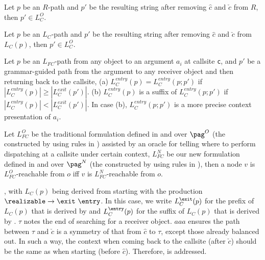 \begin{lemma} \label{theorem:Rrealizable}
Let $p$ be an $R$-path and $p'$ be the resulting string after removing $\hat{\boxed{c}}$ 
and $\check{\boxed{c}}$ from $R$, then $p' \in L_{C}^{O}$.  
\end{lemma}

\begin{corollary} \label{theorem:LCrealizable}
Let $p$ be an $L_{C}$-path and $p'$ be the resulting string after removing $\hat{\boxed{c}}$ 
and $\check{\boxed{c}}$ from $L_C(p)$, then $p' \in L_{C}^{O}$.  
\end{corollary}


\begin{lemma} \label{theorem:ContextRecovery}
Let $p$ be an $L_{FC}$-path from any object to an argument $a_i$ at callsite \texttt{c}, and $p'$ be a grammar-guided path from the argument to any receiver object and then returning back to the callsite, (a) $L_C^{entry} (p) = L_C^{entry}(p;p')$ if $|L_C^{entry} (p)| \geq |L_C^{exit}(p')|$.  (b) $L_C^{entry} (p)$ is a suffix of $L_C^{entry}(p;p')$ if $|L_C^{entry} (p)| < |L_C^{exit}(p')|$.
In case (b), $L_C^{entry}(p;p')$ is a more precise context presentation of $a_i$. 
\end{lemma}

\begin{theorem} \label{theorem:correctness}
Let $L_{FC}^{O}$ be the traditional formulation \cite{sridharan2005demand, sridharan2006refinement} defined in  and  over $\pag^{O}$ (the \pag constructed by using rules in 
) assisted by an oracle for telling where to perform dispatching at a callsite under certain context,
$L_{FC}^N$ be our new formulation defined in  and  over $\pag^N$ (the \pag constructed by using rules in ),
then a node $v$ is $L_{FC}^{O}$-reachable from $o$ iff $v$ is $L_{FC}^{N}$-reachable from $o$. 
\end{theorem}

, with $L_C(p)$ being derived from \realizable
starting with the production
$\realizable  \rightarrow \exit\ \entry$.
In this case, we write $L_C^{\exit}(p)$ for the prefix
of $L_C(p)$ that is derived by
\exit and 
$L_C^\entry(p)$ for the suffix of
$L_C(p)$  that is derived by
\entry.
  $\tau$ notes the end of searching for a receiver object. $aaa$ ensures the path between $\tau$ and $\check{\boxed{c}}$ is a symmetry of that from $\hat{\boxed{c}}$ to $\tau$, except those already balanced out. In such a way, the context when coming back to the callsite (after $\check{\boxed{c}}$) should be the same as when starting (before $\hat{\boxed{c}}$). Therefore,  is addressed.

